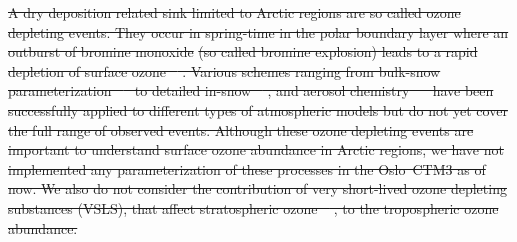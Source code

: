 \documentclass[gmd, manuscript]{copernicus}
\providecommand{\DIFdel}[1]{{\protect\color{red}\sout{#1}}}                      %
\providecommand{\DIFdelbegin}{} %
\begin{document}
\DIFdelbegin \DIFdel{A dry deposition related sink limited to Arctic regions are so called ozone depleting events. They occur in spring-time in the polar boundary layer where an outburst of bromine monoxide }%
\DIFdel{(so called bromine explosion) leads to a rapid depletion of surface ozone \mbox{%
\citep{JGR:Oltmans1981,GRL:Bottenheim1986,Nat:Barrie1988,JGR:Bottenheim2006}}\hspace{0pt}%
. Various schemes ranging from bulk-snow parameterization \mbox{%
\citep{ACP:Toyota2011,GMD:Falk2018} }\hspace{0pt}%
to detailed in-snow \mbox{%
\citep{ACP:Toyota2014a}}\hspace{0pt}%
, and aerosol chemistry \mbox{%
\citep{ACP:Yang2010} }\hspace{0pt}%
have been successfully applied to different types of atmospheric models but do not yet cover the full range of observed events. Although these ozone depleting events are important to understand surface ozone abundance in Arctic regions, we have not implemented any parameterization of these processes in the Oslo~CTM3 as of now. We also do not consider the contribution of very short-lived ozone depleting substances (VSLS), that affect stratospheric ozone \mbox{%
\citep{JGR:Warwick2006, ACP:Ziska2013, ACP:Hossaini2016, ACP:Falk2017}}\hspace{0pt}%
, to the tropospheric ozone abundance.}%
\end{document}
